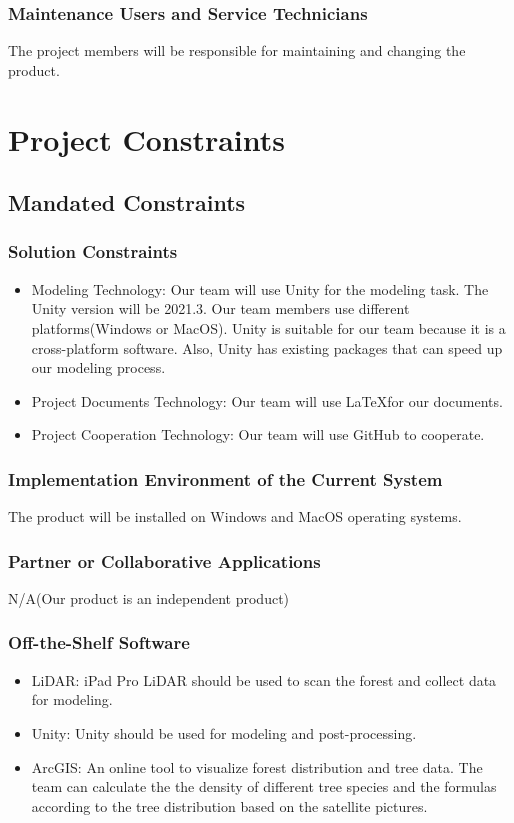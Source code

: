 \documentclass{article}
\begin{document}
\subsubsection{Maintenance Users and Service Technicians}
The project members will be responsible for maintaining and changing the product.

\newpage

\section{Project Constraints}
\subsection{Mandated Constraints}
\subsubsection{Solution Constraints}
\begin{itemize}
\item Modeling Technology: Our team will use Unity for
the modeling task. The Unity version will be 2021.3. Our
team members use different platforms(Windows or MacOS).
Unity is suitable for our team because it is a 
cross-platform software. Also, Unity has existing
packages that can speed up our modeling process.
    
\item Project Documents Technology: Our team will use
\LaTeX for our documents.
    
\item Project Cooperation Technology: Our team will use
GitHub to cooperate.
\end{itemize}

\subsubsection{Implementation Environment of the Current System}
The product will be installed on Windows and MacOS 
operating systems.

\subsubsection{Partner or Collaborative Applications}
N/A(Our product is an independent product)

\subsubsection{Off-the-Shelf Software}
\begin{itemize}
\item LiDAR: iPad Pro LiDAR should be used to scan the
forest and collect data for modeling.
\item Unity: Unity should be used for modeling and 
post-processing.
\item ArcGIS: An online tool to visualize forest 
distribution and tree data. The team can calculate the
the density of different tree species and the formulas 
according to the tree distribution based on the
satellite pictures.
\end{itemize}
\end{document}

